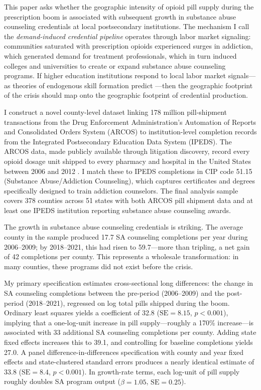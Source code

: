 \documentclass[12pt]{article}
\begin{document}
This paper asks whether the geographic intensity of opioid pill supply during the prescription boom is associated with subsequent growth in substance abuse counseling credentials at local postsecondary institutions. The mechanism I call the \textit{demand-induced credential pipeline} operates through labor market signaling: communities saturated with prescription opioids experienced surges in addiction, which generated demand for treatment professionals, which in turn induced colleges and universities to create or expand substance abuse counseling programs. If higher education institutions respond to local labor market signals---as theories of endogenous skill formation predict \citep{acemoglu2011, autor2019}---then the geographic footprint of the crisis should map onto the geographic footprint of credential production.

I construct a novel county-level dataset linking 178 million pill-shipment transactions from the Drug Enforcement Administration's Automation of Reports and Consolidated Orders System (ARCOS) to institution-level completion records from the Integrated Postsecondary Education Data System (IPEDS). The ARCOS data, made publicly available through litigation discovery, record every opioid dosage unit shipped to every pharmacy and hospital in the United States between 2006 and 2012 \citep{arcos2019}. I match these to IPEDS completions in CIP code 51.15 (Substance Abuse/Addiction Counseling), which captures certificates and degrees specifically designed to train addiction counselors. The final analysis sample covers 378 counties across 51 states with both ARCOS pill shipment data and at least one IPEDS institution reporting substance abuse counseling awards.

The growth in substance abuse counseling credentials is striking. The average county in the sample produced 17.7 SA counseling completions per year during 2006--2009; by 2018--2021, this had risen to 59.7---more than tripling, a net gain of 42 completions per county. This represents a wholesale transformation: in many counties, these programs did not exist before the crisis.

My primary specification estimates cross-sectional long differences: the change in SA counseling completions between the pre-period (2006--2009) and the post-period (2018--2021), regressed on log total pills shipped during the boom. Ordinary least squares yields a coefficient of 32.8 ($\text{SE} = 8.15$, $p < 0.001$), implying that a one-log-unit increase in pill supply---roughly a 170\% increase---is associated with 33 additional SA counseling completions per county. Adding state fixed effects increases this to 39.1, and controlling for baseline completions yields 27.0. A panel difference-in-differences specification with county and year fixed effects and state-clustered standard errors produces a nearly identical estimate of 33.8 ($\text{SE} = 8.4$, $p < 0.001$). In growth-rate terms, each log-unit of pill supply roughly doubles SA program output ($\hat{\beta} = 1.05$, $\text{SE} = 0.25$).
\end{document}
